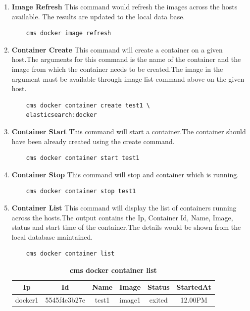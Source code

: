\documentclass[9pt,twocolumn,twoside]{../../styles/osajnl}
\begin{document}
\begin{enumerate}
    \item \textbf{Image Refresh} 
     This command would refresh the images across the hosts available. The results are updated to the local data base.
    \begin{verbatim}
    cms docker image refresh
    \end{verbatim}
    \item \textbf{Container Create}
     This command will create a container on a given host.The arguments for this command is the name of the container and the image from which the container needs to be created.The image in the argument must be available through image list command above on the given host.
    \begin{verbatim}
    cms docker container create test1 \
    elasticsearch:docker
    \end{verbatim}   
    \item \textbf{Container Start}
     This command will start a container.The container should have been already created using the create command.
    \begin{verbatim}
    cms docker container start test1
    \end{verbatim}         
    \item \textbf{Container Stop}
     This command will stop and container which is running.
    \begin{verbatim}
    cms docker container stop test1
    \end{verbatim}     
    \item \textbf{Container List}
     This command will display the list of containers running across the hosts.The output contains the Ip, Container Id, Name, Image, status and start time of the container.The details would be shown from the local database maintained.  
    \begin{verbatim}
    cms docker container list
    \end{verbatim}  
     \begin{table}[h!]
     \caption{\bf cms docker container list }
     \begin{tabular}{cccccc}
     \hline
      Ip & Id & Name & Image &Status&StartedAt\\
      \hline
      docker1 & 5545f4e3b27e & test1 & image1 &exited & 12.00PM \\
     \hline
     \end{tabular}
     \label{tab:tab3}
     \end{table}
     

\end{enumerate}
\end{document}
